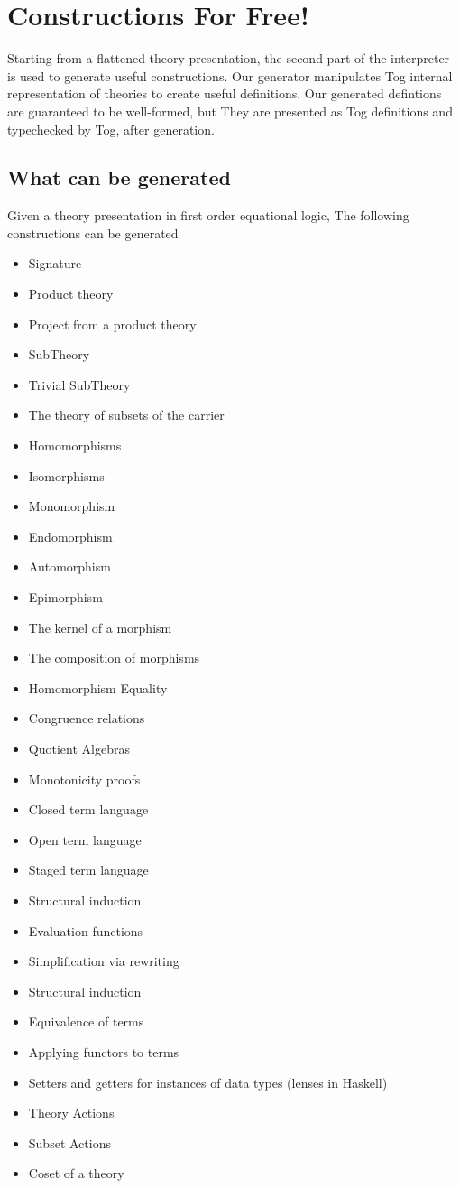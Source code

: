 \chapter{Constructions For Free!}
\label{ch:generation}

Starting from a flattened theory presentation, the second part of the interpreter is used to generate useful constructions. Our generator manipulates Tog internal representation of theories to create useful definitions. Our generated defintions are guaranteed to be well-formed, but They are presented as Tog definitions and typechecked by Tog, after generation. 

\section{What can be generated}
Given a theory presentation  in first order equational logic, The following constructions can be generated 
\begin{itemize}
    \item Signature 
    \item Product theory 
    \item Project from a product theory 
    \item SubTheory 
    \item Trivial SubTheory 
    \item The theory of subsets of the carrier 
    \item Homomorphisms 
    \item Isomorphisms 
    \item Monomorphism 
    \item Endomorphism 
    \item Automorphism 
    \item Epimorphism 
    \item The kernel of a morphism 
    \item The composition of morphisms 
    \item Homomorphism Equality 
    \item Congruence relations 
    \item Quotient Algebras
    \item Monotonicity proofs 
    \item Closed term language 
    \item Open term language 
    \item Staged term language 
    \item Structural induction 
    \item Evaluation functions 
    \item Simplification via rewriting 
    \item Structural induction 
    \item Equivalence of terms 
    \item Applying functors to terms 
    \item Setters and getters for instances of data types (lenses in Haskell) 
    \item Theory Actions 
    \item Subset Actions
    \item Coset of a theory 
\end{itemize}

